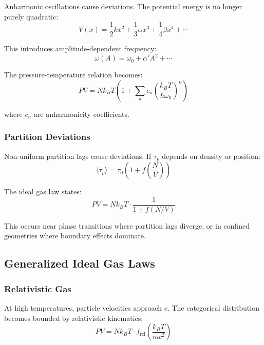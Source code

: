 Anharmonic oscillations cause deviations. The potential energy is no longer purely quadratic:
\begin{equation}
V(x) = \frac{1}{2}kx^2 + \frac{1}{3}\alpha x^3 + \frac{1}{4}\beta x^4 + \cdots
\end{equation}

This introduces amplitude-dependent frequency:
\begin{equation}
\omega(A) = \omega_0 + \alpha' A^2 + \cdots
\end{equation}

The pressure-temperature relation becomes:
\begin{equation}
PV = Nk_B T \left(1 + \sum_n c_n \left(\frac{k_B T}{\hbar\omega_0}\right)^n\right)
\end{equation}

where $c_n$ are anharmonicity coefficients.

\subsubsection{Partition Deviations}

Non-uniform partition lags cause deviations. If $\tau_p$ depends on density or position:
\begin{equation}
\langle\tau_p\rangle = \tau_0 \left(1 + f\left(\frac{N}{V}\right)\right)
\end{equation}

The ideal gas law states:
\begin{equation}
PV = Nk_B T \cdot \frac{1}{1 + f(N/V)}
\end{equation}

This occurs near phase transitions where partition lags diverge, or in confined geometries where boundary effects dominate.

\subsection{Generalized Ideal Gas Laws}

\subsubsection{Relativistic Gas}

At high temperatures, particle velocities approach $c$. The categorical distribution becomes bounded by relativistic kinematics:
\begin{equation}
PV = Nk_B T \cdot f_{\text{rel}}\left(\frac{k_B T}{mc^2}\right)
\end{equation}

